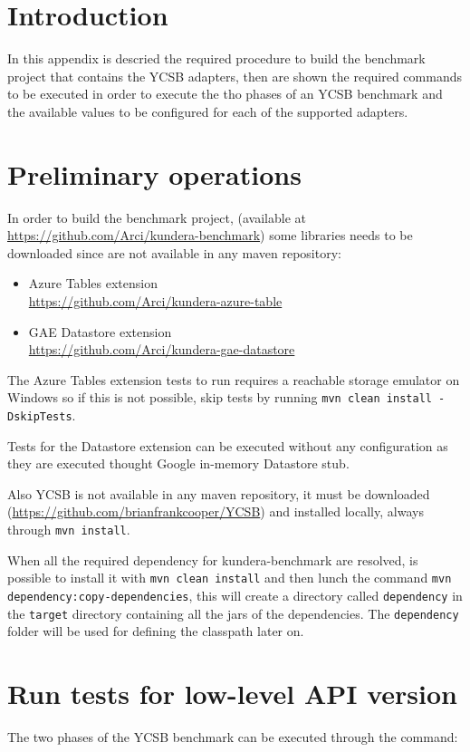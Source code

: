 \section{Introduction}
In this appendix is descried the required procedure to build the benchmark project that contains the YCSB adapters, then are shown the required commands to be executed in order to execute the tho phases of an YCSB benchmark and the available values to be configured for each of the supported adapters.

\section{Preliminary operations}
In order to build the benchmark project, (available at \url{https://github.com/Arci/kundera-benchmark}) some libraries needs to be downloaded since are not available in any maven repository:
\begin{itemize}
\item Azure Tables extension\\ \url{https://github.com/Arci/kundera-azure-table}
\item GAE Datastore extension \\\url{https://github.com/Arci/kundera-gae-datastore}
\end{itemize}

\noindent The Azure Tables extension tests to run requires a reachable storage emulator on Windows so if this is not possible, skip tests by running \texttt{mvn clean install -DskipTests}.
 
\noindent Tests for the Datastore extension can be executed without any configuration as they are executed thought Google in-memory Datastore stub.

\noindent Also YCSB is not available in any maven repository, it must be downloaded (\url{https://github.com/brianfrankcooper/YCSB}) and installed locally, always through \texttt{mvn install}.

\newparagraph When all the required dependency for kundera-benchmark are resolved, is possible to install it with \texttt{mvn clean install} and then lunch the command \texttt{mvn dependency:copy-dependencies}, this will create a directory called \texttt{dependency} in the \texttt{target} directory containing all the jars of the dependencies. The \texttt{dependency} folder will be used for defining the classpath later on.

\section{Run tests for low-level API version}
\label{appendix:ycsb-low-level}
The two phases of the YCSB benchmark can be executed through the command:

